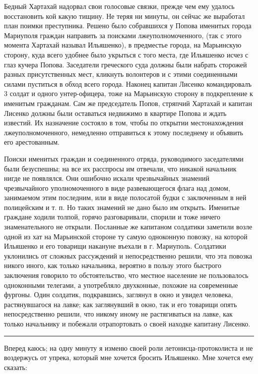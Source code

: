 \documentclass[a4paper,20pt]{report}
\begin{document}
Бедный Хартахай надорвал свои голосовые связки, прежде чем ему удалось
восстановить кой какую тищину. Не теряя ни минуты, он сейчас же выработал план
поимки преступника. Решено было собравшихся у Попова именитых города Мариуполя
граждан направить за поисками лжеуполномоченного, (так с этого момента Хартахай
называл Ильяшенко), в предместье города, на Марьинскую сторону, куда всего
удобнее было укрыться с того места, где Ильяшенко исчез с глаз кучера Попова.
Заседатели греческого суда должны были набрать сторожей разных присутственных
мест, кликнуть волонтеров и с этими соединенными силами пуститься в обход всего
города. Наконец капитан Лисенко командировалъ 3 солдат и одного унтер-офицера,
тоже на Марьинскую сторону в подкрепление к именитым гражданам. Сам же
председатель Попов, стряпчий Хартахай и капитан Лисенко должны были оставаться
недвижимо в квартире Попова и ждать известий. Их назначение состояло в том,
чтобы по открытии местонахождения лжеуполномоченного, немедленно отправиться к
этому последнему и объявить его арестованным.

Поиски именитых граждан и соединенного отряда, руководимого заседателями были безуспешны;
на все их расспросы им отвечали, что никакой начальник нигде не появлялся. Они ошибочно искали
чрезвычайных знамений чрезвычайного уполномоченного в виде развевающегося флага
над домом, занимаемом этим последним, или в виде полосатой будки с заключенным в ней полицейским и т. п.
Но таких знамений не дано было им открыть. Именитые граждане ходили толпой, 
горячо разговаривали, спорили и тоже ничего знаменательного не открыли. Посланные
же капитаном солдатики заметили возле одной из хат
на Марьинской стороне ту самую одноконную повозку, на
которой Ильяшенко и его товарищи накануне въехали в
г. Мариуполь. Солдатики уклонились от сложных рассуждений
и непосредственно решили, что эта повозка никого
иного, как только начальника, вероятно в пользу этого
быстрого заключения говорило то обстоятельство, что местное
население не пользовалось одноконными телегами, а употребляло двухконные, 
похожие на современные фургоны. Один
солдатик, подкравшись, заглянул в окно и увидел человека, 
растянувшагося на лавке; как заглянувший в окно,
так и его товарищи опять непосредственно решили, что
никому иному не растягиваться на лавке, как только начальнику и 
побежали отрапортовать о своей находке капитану Лисенко.

\par\noindent\rule{\textwidth}{0.4pt}

Вперед каюсь; на одну минуту я изменю своей роли
летонисца-протоколиста и не воздержусь от упрека, который
мне хочется бросить Ильяшенко. Мне хочется ему сказать:
\end{document}
